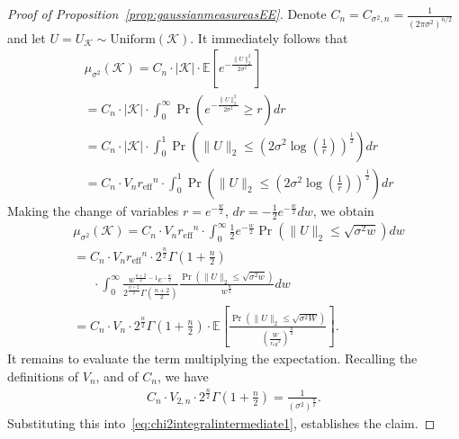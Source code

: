 \documentclass[article,doublecolumn]{IEEEtran}
\newcommand{\EE}{{\mathbb{E}}}
\newcommand{\Unif}{\mathrm{Uniform}}
\newcommand{\KK}{{\mathcal{K}}}
\newcommand{\reff}{{r_{\mathrm{eff}}}}
\begin{document}
\begin{proof}[Proof of Proposition~\ref{prop:gaussianmeasureasEE}]
Denote $C_n=C_{\sigma^2,n}=\frac{1}{(2\pi\sigma^2)^{n/2}}$ and let $U=U_{\KK}\sim\Unif(\KK)$.
It immediately follows that
\begin{align}
&\mu_{\sigma^2}(\KK)=C_n\cdot |\KK|\cdot \EE\left[e^{-\frac{\|U\|_2^2}{2\sigma^2}} \right]\\
&=C_n\cdot |\KK|\cdot \int_{0}^{\infty}\Pr\left(e^{-\frac{\|U\|_2^2}{2\sigma^2}}\geq r \right)dr\\
&=C_n\cdot |\KK|\cdot \int_{0}^{1}\Pr\left(\|U\|_2\leq\left(2\sigma^2 \log\left(\frac{1}{r}\right) \right)^{\frac{1}{2}} \right)dr\\
&=C_n\cdot V_{n}\reff^n \cdot \int_{0}^{1}\Pr\left(\|U\|_2\leq\left(2\sigma^2 \log\left(\frac{1}{r}\right) \right)^{\frac{1}{2}} \right)dr
\label{eq:muintegralformula}
\end{align}
Making the change of variables $r=e^{-\frac{w}{2}}$, $dr=-\frac{1}{2}e^{-\frac{w}{2}}dw$, we obtain
\begin{align}
 &\mu_{\sigma^2}(\KK)=C_n\cdot V_{n}\reff^n\cdot\int_{0}^{\infty} \frac{1}{2}e^{-\frac{w}{2}}\Pr\left(\|U\|_2\leq\sqrt{\sigma^2 w} \right)dw\\
 &=C_n\cdot V_{n}\reff^n \cdot 2^{\frac{n}{2}}\Gamma\left(1+\frac{n}{2}\right)\nonumber\\
&~~~~~~~\cdot\int_{0}^{\infty}\frac{w^{\frac{n+2}{2}-1}e^{-\frac{w}{2}}}{2^{\frac{n+2}{2}}\Gamma\left(\frac{n+2}{2} \right)} \frac{\Pr\left(\|U\|_2\leq\sqrt{\sigma^2 w} \right)}{w^{\frac{n}{2}}}dw\\
 &=C_n\cdot V_{n} \cdot 2^{\frac{n}{2}}\Gamma\left(1+\frac{n}{2}\right)\cdot\EE\left[\frac{\Pr\left(\|U\|_2\leq\sqrt{\sigma^2 W} \right)}{\left(\frac{W}{\reff^2}\right)^{\frac{n}{2}}} \right].
 \label{eq:chi2integralintermediate1}
\end{align}
It remains to evaluate the term multiplying the expectation. Recalling the definitions of $V_{n}$, and of $C_n$, we have
\begin{align}
C_n\cdot V_{2,n} \cdot 2^{\frac{n}{2}}\Gamma\left(1+\frac{n}{2}\right)=\frac{1}{(\sigma^2)^{\frac{n}{2}}}.  
\end{align}
Substituting this into~\eqref{eq:chi2integralintermediate1}, establishes the claim.
\end{proof}
\end{document}
